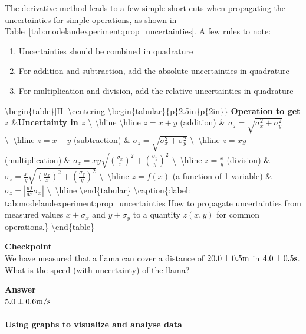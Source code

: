 The derivative method leads to a few simple short cuts when propagating the uncertainties for simple operations, as shown in Table~\ref{tab:modelandexperiment:prop_uncertainties}. A few rules to note:

\begin{enumerate}
\item Uncertainties should be combined in quadrature
\item For addition and subtraction, add the absolute uncertainties in quadrature
\item For multiplication and division, add the relative uncertainties in quadrature
\end{enumerate}

{\textbackslash}begin\{table\}[H]
{\textbackslash}centering
{\textbackslash}begin\{tabular\}\{p\{2.5in\}p\{2in\}\}
\textbf{Operation to get $z$} \&\textbf{Uncertainty in $z$} {\textbackslash}
{\textbackslash}hline
{\textbackslash}hline
$z=x+y$ (addition) \&  $\sigma_z=\sqrt{\sigma_x^2+\sigma_y^2}$ {\textbackslash}~{\textbackslash}hline
$z=x -y$ (subtraction) \& $\sigma_z=\sqrt{\sigma_x^2+\sigma_y^2}$ {\textbackslash}~{\textbackslash}hline
$z=xy$ (multiplication) \& $\sigma_z=xy\sqrt{\left(\frac{\sigma_x}{x}\right)^2+\left(\frac{\sigma_y}{y}\right)^2}$ {\textbackslash}~{\textbackslash}hline
$z=\frac{x}{y}$ (division) \& $\sigma_z=\frac{x}{y}\sqrt{\left(\frac{\sigma_x}{x}\right)^2+\left(\frac{\sigma_y}{y}\right)^2}$ {\textbackslash}~{\textbackslash}hline
$z=f(x)$ (a function of 1 variable) \&$\sigma_z=\left|\frac{df}{dx}\sigma_x \right|$ {\textbackslash}~{\textbackslash}hline
{\textbackslash}end\{tabular\}
{\textbackslash}caption\{:label: tab:modelandexperiment:prop\_uncertainties How to propagate uncertainties from measured values $x\pm\sigma_x$ and $y\pm\sigma_y$ to a quantity $z(x,y)$ for common operations.\}
{\textbackslash}end\{table\}

\begin{framed}
\textbf{Checkpoint}\\
We have measured that a llama can cover a distance of $20.0 \pm 0.5 {\rm m}$ in $4.0\pm 0.5 {\rm s}$. What is the speed (with uncertainty) of the llama?

\begin{framed}
\textbf{Answer}\\
$5.0 \pm 0.6 {\rm m/s}$
\end{framed}
\end{framed}

\paragraph{Using graphs to visualize and analyse data}

